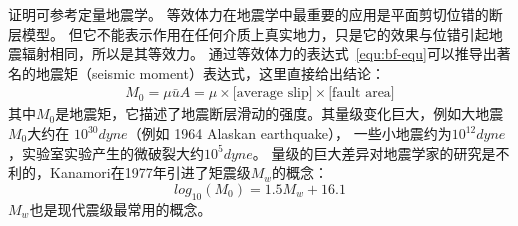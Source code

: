 证明可参考定量地震学\citep{aki2002quantitative}。
等效体力在地震学中最重要的应用是平面剪切位错的断层模型。
但它不能表示作用在任何介质上真实地力，只是它的效果与位错引起地震辐射相同，所以是其等效力。
通过等效体力的表达式~\ref{equ:bf-equ}可以推导出著名的地震矩（seismic moment）表达式，这里直接给出结论：
\begin{align}
    M_0 = \mu \bar{u} A = \mu \times  \text{[average slip]} \times \text{[fault area]}
\end{align}
其中$M_0$是地震矩，它描述了地震断层滑动的强度。其量级变化巨大，例如大地震$M_0$大约在 $10^{30} dyne$（例如 1964 Alaskan earthquake），
一些小地震约为$10^{12} dyne$，实验室实验产生的微破裂大约$10^{5} dyne$。
量级的巨大差异对地震学家的研究是不利的，Kanamori在1977年\citep{Kanamori1993}引进了矩震级$M_w$的概念：
\begin{equation}
    log_{10}(M_0)  = 1.5M_w + 16.1
\end{equation}
$M_w$也是现代震级最常用的概念。



